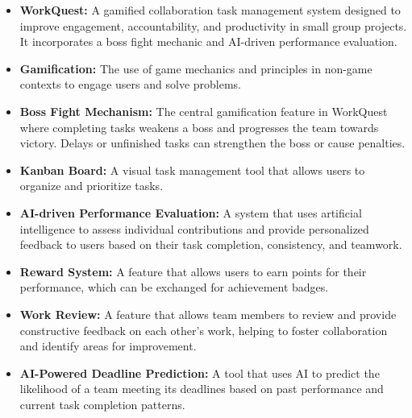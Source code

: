 \begin{itemize}  
    \item \textbf{WorkQuest:} A gamified collaboration task management system designed to improve engagement, accountability, and productivity in small group projects. It incorporates a boss fight mechanic and AI-driven performance evaluation. 
    \item \textbf{Gamification:} The use of game mechanics and principles in non-game contexts to engage users and solve problems.  
    \item \textbf{Boss Fight Mechanism:} The central gamification feature in WorkQuest where completing tasks weakens a boss and progresses the team towards victory. Delays or unfinished tasks can strengthen the boss or cause penalties.  
    \item \textbf{Kanban Board:} A visual task management tool that allows users to organize and prioritize tasks.
    \item \textbf{AI-driven Performance Evaluation:} A system that uses artificial intelligence to assess individual contributions and provide personalized feedback to users based on their task completion, consistency, and teamwork.  
    \item \textbf{Reward System:} A feature that allows users to earn points for their performance, which can be exchanged for achievement badges.
    \item \textbf{Work Review:} A feature that allows team members to review and provide constructive feedback on each other’s work, helping to foster collaboration and identify areas for improvement.  
    \item \textbf{AI-Powered Deadline Prediction:} A tool that uses AI to predict the likelihood of a team meeting its deadlines based on past performance and current task completion patterns.  
\end{itemize}  
